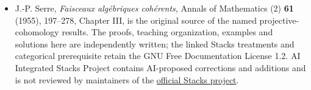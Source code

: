 \documentclass[11pt]{article}
\begin{document}
\begin{itemize}
{  01VT}. Lemma 1.3 above proves the required embedding, including the
  proper graph argument; the corresponding geometric reference is
  \href{https://kokunoyumeto.github.io/stacks-zh-hans-cn/en/morphisms.html\#morphisms-lemma-image-proper-scheme-closed}{Tag
  01W6}. These are geometric prerequisites, rather than appeals to a
  later cohomological theorem.
\item
  J.-P. Serre, \emph{Faisceaux algébriques cohérents}, Annals of
  Mathematics (2) \textbf{61} (1955), 197--278, Chapter III, is the
  original source of the named projective-cohomology results. The
  proofs, teaching organization, examples and solutions here are
  independently written; the linked Stacks treatments and categorical
  prerequisite retain the GNU Free Documentation License 1.2. AI
  Integrated Stacks Project contains AI-proposed corrections and
  additions and is not reviewed by maintainers of the
  \href{https://stacks.math.columbia.edu/}{official Stacks project}.
\end{itemize}
\end{document}
